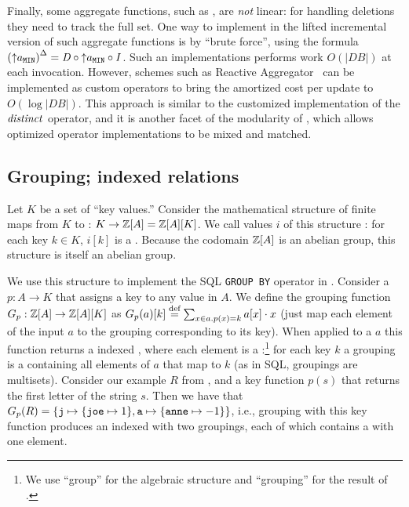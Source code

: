 Finally, some aggregate functions, such as , are
\emph{not} linear: for handling deletions
they need to track the full set.  One way to implement in \dbsp the lifted
incremental version of such aggregate functions is
by ``brute force'', using the formula ${({\uparrow}a_\texttt{MIN})}^{\Delta}
= \mathit{D} \circ {\uparrow}a_\texttt{MIN} \circ \mathit{I}$.  Such an implementations performs work
$O(|DB|)$ at each invocation.  However, schemes
such as Reactive Aggregator~\cite{tangwongsan-vldb15} can be implemented as custom \dbsp operators to bring
the amortized cost per update to $O(\log |DB|)$.  This approach is similar to the
customized implementation of the $\mathit{distinct}$ operator, and it is another facet of
the modularity of \dbsp, which allows optimized operator implementations to be
mixed and matched.

\subsection{Grouping; indexed relations}\label{sec:grouping}

Let $K$ be a set of ``key values.''
Consider the mathematical structure of finite maps from $K$
to \zrs: $K \to \mathbb{Z}[A] = \mathbb{Z}[A][K]$.
We call values $i$ of this structure : for
each key $k \in K$, $i[k]$ is a \zr.  Because
the codomain $\mathbb{Z}[A]$ is an abelian group, this structure is itself
an abelian group.

We use this structure to implement the SQL \texttt{GROUP BY} operator in \dbsp.
Consider a 
$p: A \to K$ that assigns a key to any value in $A$.  We define the grouping function
$G_p: \mathbb{Z}[A] \to \mathbb{Z}[A][K]$ as $G_p(a)[k] \stackrel{\textrm{\scriptsize def}}{=} \sum_{x \in a.p(x)=k}a[x] \cdot x$
(just map each element of the input $a$ to the \zr grouping corresponding to its key).
When applied to a \zr $a$ this function returns a indexed \zr, where each element
is a :\footnote{We use
``group'' for the algebraic structure and ``grouping'' for the result of .} for each key $k$ a
grouping is a \zr containing all elements of $a$ that map to $k$
(as in SQL, groupings are multisets).
Consider our example \zr $R$ from ,
and a key function $p(s)$ that returns the first letter of the string
$s$. Then we have that $G_p(R) = \{ \mbox{\texttt{j}} \mapsto \{ \mbox{\texttt{joe}}
\mapsto 1 \}, \mbox{\texttt{a}} \mapsto \{ \mbox{\texttt{anne}} \mapsto -1 \} \}$,
i.e., grouping with this key function produces an indexed \zr with two groupings, each
of which contains a \zr with one element.

